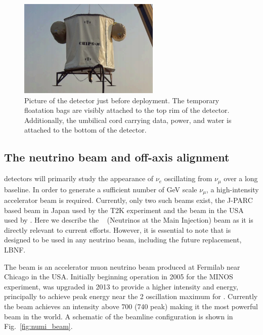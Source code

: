 \begin{figure} %
    \includegraphics[width=0.6\textwidth]{diagrams/4-chips/chips_m.png}
    \caption[Picture of the \chipsm detector.]
    {Picture of the \chipsm detector just before deployment. The temporary floatation bags are
        visibly attached to the top rim of the detector. Additionally, the umbilical cord carrying
        data, power, and water is attached to the bottom of the detector.}
    \label{fig:chips_m}
\end{figure}

\subsection{The neutrino beam and off-axis alignment} %
\label{sec:chips_concept_beam} %

\chips detectors will primarily study the appearance of $\nu_{e}$ oscillating from $\nu_{\mu}$
over a long baseline. In order to generate a sufficient number of GeV scale $\nu_{\mu}$, a
high-intensity accelerator beam is required. Currently, only two such beams exist, the J-PARC
based beam in Japan used by the T2K experiment and the \numi beam in the USA used by \nova. Here
we describe the \numi~\cite{adamson2016} (Neutrinos at the Main Injection) beam as it is directly
relevant to current \chips efforts. However, it is essential to note that \chips is designed to be
used in any neutrino beam, including the future \numi replacement, LBNF.

The \numi beam is an accelerator muon neutrino beam produced at Fermilab near Chicago in the USA.
Initially beginning operation in 2005 for the MINOS experiment, \numi was upgraded in 2013 to
provide a higher intensity and energy, principally to achieve peak energy near the \unit{2}{\GeV}
oscillation maximum for \nova. Currently the \numi beam achieves an intensity above
\unit{700}{} (\unit{740}{} peak) making it the most powerful beam in the
world. A schematic of the \numi beamline configuration is shown in Fig.~\ref{fig:numi_beam}.

